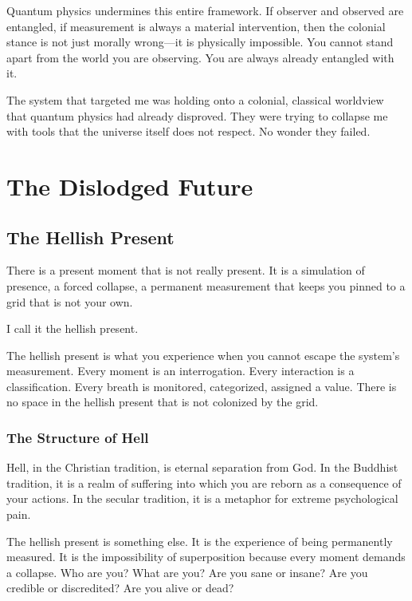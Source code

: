 \documentclass[11pt,openany]{book}
\begin{document}
Quantum physics undermines this entire framework. If observer and observed are entangled, if measurement is always a material intervention, then the colonial stance is not just morally wrong---it is physically impossible. You cannot stand apart from the world you are observing. You are always already entangled with it.

The system that targeted me was holding onto a colonial, classical worldview that quantum physics had already disproved. They were trying to collapse me with tools that the universe itself does not respect. No wonder they failed.


\part{The Dislodged Future}

\chapter{The Hellish Present}

There is a present moment that is not really present. It is a simulation of presence, a forced collapse, a permanent measurement that keeps you pinned to a grid that is not your own.

I call it the hellish present.

The hellish present is what you experience when you cannot escape the system's measurement. Every moment is an interrogation. Every interaction is a classification. Every breath is monitored, categorized, assigned a value. There is no space in the hellish present that is not colonized by the grid.

\section*{The Structure of Hell}

Hell, in the Christian tradition, is eternal separation from God. In the Buddhist tradition, it is a realm of suffering into which you are reborn as a consequence of your actions. In the secular tradition, it is a metaphor for extreme psychological pain.

The hellish present is something else. It is the experience of being permanently measured. It is the impossibility of superposition because every moment demands a collapse. Who are you? What are you? Are you sane or insane? Are you credible or discredited? Are you alive or dead?
\end{document}
